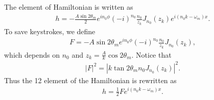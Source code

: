 \documentclass[letterpaper,12pt,english]{sphinxmanual}
\begin{document}
The element of Hamiltonian is written as
\begin{equation*}
\begin{split}h = - \frac{A\sin 2\theta_m}{2} e^{in_0\phi} (-i)^{n_0} \frac{n_0}{z_k} J_{n_0 }(z_k) e^{i(n_0 k -\omega_m)x}.\end{split}
\end{equation*}
To save keystrokes, we define
\label{\detokenize{matter-stimulated/single-frequency:equation-definition-F}}\begin{equation}\label{equation:matter-stimulated/single-frequency:definition-F}
\begin{split}F = - A\sin 2\theta_m e^{i n_0 \phi} (-i)^{n_0} \frac{n_0}{z_k} J_{n_0} (z_k) ,\end{split}
\end{equation}
which depends on \(n_0\) and \(z_k = \frac{A}{k} \cos 2\theta_m\). Notice that
\begin{equation*}
\begin{split}\lvert F \rvert^2 = \left\lvert  k \tan 2\theta_m  n_0 J_{n_0} (z_k) \right\rvert^2 .\end{split}
\end{equation*}
Thus the 12 element of the Hamiltonian is rewritten as
\label{\detokenize{matter-stimulated/single-frequency:equation-eqn-12-element-and-F}}\begin{equation}\label{equation:matter-stimulated/single-frequency:eqn-12-element-and-F}
\begin{split}h = \frac{1}{2}F e^{i(n_0 k -\omega_m)x}.\end{split}
\end{equation}
\end{document}
